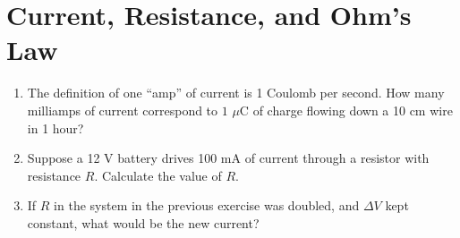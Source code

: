 \documentclass{article}
\begin{document}
\section{Current, Resistance, and Ohm's Law}

\begin{enumerate}
\item The definition of one ``amp'' of current is 1 Coulomb per second.  How many milliamps of current correspond to $1$ $\mu$C of charge flowing down a 10 cm wire in 1 hour? \\ \vspace{1cm}
\item Suppose a 12 V battery drives 100 mA of current through a resistor with resistance $R$.  Calculate the value of $R$. \\ \vspace{1cm}
\item If $R$ in the system in the previous exercise was doubled, and $\Delta V$ kept constant, what would be the new current?
\end{enumerate}
\end{document}
